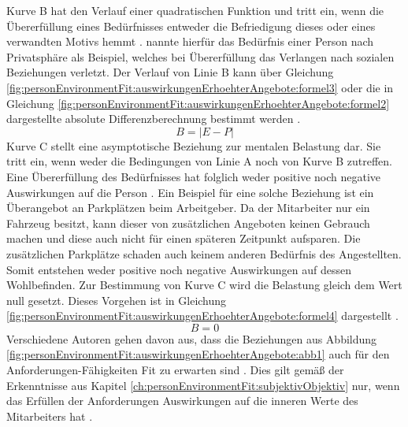 Kurve B hat den Verlauf einer quadratischen Funktion und tritt ein, wenn die Übererfüllung eines Bedürfnisses entweder die Befriedigung dieses oder eines verwandten Motivs hemmt \cite[S. 5]{caplan:1987}\cite[S. 21]{edwards:2008}. \textcite[S. 12]{harrison:1978} nannte hierfür das Bedürfnis einer Person nach Privatsphäre als Beispiel, welches bei Übererfüllung das Verlangen nach sozialen Beziehungen verletzt. Der Verlauf von Linie B kann über Gleichung \ref{fig:personEnvironmentFit:auswirkungenErhoehterAngebote:formel3} oder die in Gleichung \ref{fig:personEnvironmentFit:auswirkungenErhoehterAngebote:formel2} dargestellte absolute Differenzberechnung bestimmt werden \cite[S. 2]{edwards:1993}.
\begin{equation}
	B = |E - P|
	\label{fig:personEnvironmentFit:auswirkungenErhoehterAngebote:formel2}
\end{equation}
Kurve C stellt eine asymptotische Beziehung zur mentalen Belastung dar. Sie tritt ein, wenn weder die Bedingungen von Linie A noch von Kurve B zutreffen. Eine Übererfüllung des Bedürfnisses hat folglich weder positive noch negative Auswirkungen auf die Person \cite[S. 21]{edwards:2008}\cite[S. 30]{mechanismsOfJobStressAndStrain:1982}. Ein Beispiel für eine solche Beziehung ist ein Überangebot an Parkplätzen beim Arbeitgeber. Da der Mitarbeiter nur ein Fahrzeug besitzt, kann dieser von zusätzlichen Angeboten keinen Gebrauch machen und diese auch nicht für einen späteren Zeitpunkt aufsparen. Die zusätzlichen Parkplätze schaden auch keinem anderen Bedürfnis des Angestellten. Somit entstehen weder positive noch negative Auswirkungen auf dessen Wohlbefinden. Zur Bestimmung von Kurve C wird die Belastung gleich dem Wert null gesetzt. Dieses Vorgehen ist in Gleichung \ref{fig:personEnvironmentFit:auswirkungenErhoehterAngebote:formel4} dargestellt \cite[S. 2]{edwards:1993}.
\begin{equation}
	B = 0
	\label{fig:personEnvironmentFit:auswirkungenErhoehterAngebote:formel4}
\end{equation}
Verschiedene Autoren gehen davon aus, dass die Beziehungen aus Abbildung \ref{fig:personEnvironmentFit:auswirkungenErhoehterAngebote:abb1} auch für den Anforderungen-Fähigkeiten Fit zu erwarten sind \cite[S. 31]{mechanismsOfJobStressAndStrain:1982}\cite[S. 12f.]{harrison:1978}. Dies gilt gemäß der Erkenntnisse aus Kapitel \ref{ch:personEnvironmentFit:subjektivObjektiv} nur, wenn das Erfüllen der Anforderungen Auswirkungen auf die inneren Werte des Mitarbeiters hat \cite[S. 12f.]{harrison:1978}.

